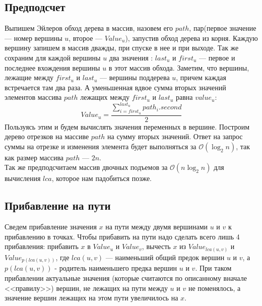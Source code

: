 \documentclass{article}
\begin{document}
\subsection*{Предподсчет}
Выпишем Эйлеров обход дерева в массив, назовем его $path$, пар(первое значение --- номер вершины $u$, второе --- $Value_u$), запустив обход дерева из корня. Каждую вершину запишем в массив дважды, при спуске в нее и при выходе. Так же сохраним для каждой вершины $u$ два значения : $last_u$ и $first_u$ --- первое и последнее вхождения вершины $u$ в этот массив обхода. Заметим, что вершины, лежащие между $first_u$ и $last_u$ --- вершины поддерева $u$, причем каждая встречается там два раза. А уменьшенная вдвое сумма вторых значений элементов массива $path$ лежащих между $first_u$ и $last_u$ равна $value_u$:
\begin{equation}
Value_u = \frac{\sum_{i = first_u}^{last_u}path_i.second}{2}
\end{equation}
Пользуясь этим и будем вычислять значения переменных в вершине. Построим дерево отрезков на массиве $path$ на сумму вторых значений. Ответ на запрос суммы на отрезке и изменения элемента будет выполняться за $\mathcal{O}(\log_2{n})$, так как размер массива $path$ --- $2n$.
\\
Так же предподсчитаем массив двочных подъемов за $\mathcal{O}(n\log_2{n})$ для вычисления $lca$, которое нам падобиться позже.

\subsection*{Прибавление на пути}
Сведем прибавление значения $x$ на пути между двумя вершинами $u$ и $v$ к прибавлению в точках. Чтобы прибавить на пути надо сделать всего лишь 4 прибавления: прибавить $x$ в $Value_u$ и $Value_v$, вычесть $x$ из $Value_{lca(u, v)}$ и $Value_{p(lca(u, v))}$, где $lca(u, v)$ --- наименьший общий предок вершин $u$ и $v$, а $p(lca(u, v))$ - родитель наименьшего предка вершин $u$ и $v$. При таком прибавлении актуальные значения (которые считаются по описанному вначале <<правилу>>) вершин, не лежащих на пути между $u$ и $v$ не поменялось, а значение вершин лежащих на этом пути увеличилось на $x$. 
\end{document}
